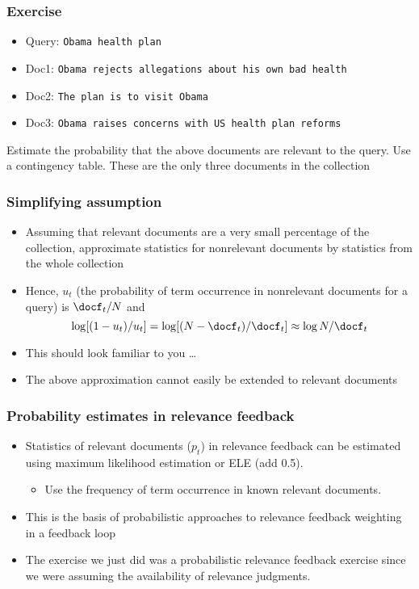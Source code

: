 \documentclass[compress]{beamer}
\begin{document}
\begin{frame}
\frametitle{Exercise}
\pause

\begin{itemize}
\item Query: \texttt{Obama health plan}
\item Doc1: \texttt{Obama rejects allegations about his own bad health}
\item Doc2: \texttt{The plan is to visit Obama}
\item Doc3: \texttt{Obama raises concerns with US health plan reforms}
\end{itemize}
\pause
Estimate the probability that the above documents are relevant to the query. Use a contingency table. These are the only three documents in the collection
\end{frame} 

\begin{frame}[<+->]
\frametitle{Simplifying assumption}
\pause[2]

\begin{itemize}\item Assuming that relevant documents are a very small percentage of the collection, approximate statistics for nonrelevant documents by statistics from the whole collection

\item Hence, $u_t$ (the probability of term occurrence in nonrelevant documents for a query) is $\docf_t/N$ and
\begin{equation}
\nonumber
\log [(1-u_t)/u_t] = \log [(N-\docf_t)/\docf_t] \approx \log N/\docf_t 
\end{equation}

\item This should look familiar to you \ldots

\item The above approximation cannot easily be extended to relevant documents
\end{itemize}
\end{frame}


\begin{frame}[<+->]
\frametitle{Probability estimates in relevance feedback}
\pause[2]






\begin{itemize}
\item Statistics of relevant documents ($p_t$) in relevance
  feedback can be estimated using maximum likelihood
  estimation or ELE (add 0.5).
\begin{itemize}
\item Use the frequency of term occurrence in known relevant
  documents. 
\end{itemize}
\item This is the basis of probabilistic approaches to relevance feedback weighting in a feedback loop
\item The exercise we just did was a probabilistic relevance
  feedback exercise since we were assuming the availability
  of relevance judgments.
\end{itemize}

\end{frame}
\end{document}
